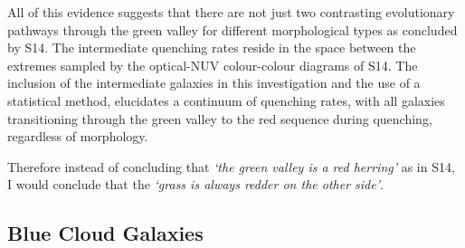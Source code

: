 All of this evidence suggests that there are not just two contrasting evolutionary pathways through the green valley for different morphological types as concluded by S14. The intermediate quenching rates reside in the space between the extremes sampled by the optical-NUV colour-colour diagrams of S14. The inclusion of the intermediate galaxies in this investigation and the use of a statistical method, elucidates a continuum of quenching rates, with all galaxies transitioning through the green valley to the red sequence during quenching, regardless of morphology. 

Therefore instead of concluding that \emph{`the green valley is a red herring'} as in S14, I would conclude that the \emph{`grass is always redder on the other side'}.


\subsection{Blue Cloud Galaxies}\label{bc}

